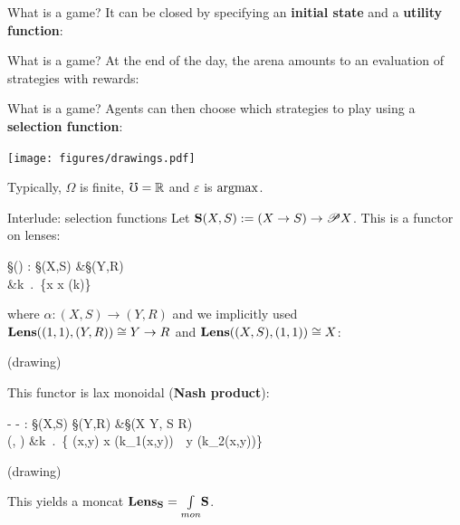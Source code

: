 \begin{frame}{What is a game?}
	It can be closed by specifying an \textbf{initial state} and a \textbf{utility function}:

	\begin{center}
	\end{center}
\end{frame}

\begin{frame}{What is a game?}
	At the end of the day, the \textcolor{colorarena}{arena} amounts to an evaluation of strategies with rewards:

	\vspace{5ex}
	\begin{center}
	\end{center}
\end{frame}

\begin{frame}{What is a game?}
	\textcolor{coloragents}{Agents} can then choose which strategies to play using a \textcolor{coloragents}{\textbf{selection function}}:


	\begin{center}
		\texttt{[image: figures/drawings.pdf]}
	\end{center}

	\textcolor{colornote}{Typically, $\Omega$ is finite, $\Comega = \R$ and $\varepsilon$ is $\operatorname{argmax}$.}
\end{frame}

\begin{frame}{Interlude: selection functions}
	Let $\mathbf{S}(X,S) := (X \to S) \to \mathscr{P}{X}$. This is a functor on lenses:
	\begin{eqalign*}
		\S(\alpha) : \S(X,S) &\longto \S(Y,R)\\
		\varepsilon &\longmapsto \lambda k \,.\, \{x \cmp \alpha \suchthat x \in \varepsilon(\alpha \cmp k)\}
	\end{eqalign*}
	where $\alpha : (X, S) \to (Y,R)$ and we implicitly used $\mathbf{Lens}((1,1),(Y,R)) \overset{}{\cong} Y \to R$ and $\mathbf{Lens}((X,S),(1,1)) \overset{}{\cong} X$:

	(drawing)

	This functor is lax monoidal (\textbf{Nash product}):
	\begin{eqalign*}
		- \boxtimes - : \S(X,S) \times \S(Y,R) &\longto \S(X \times Y, S \times R)\\
		(\varepsilon, \eta) &\longmapsto \lambda k \,.\, \{ (x,y) \suchthat x \in \varepsilon(k_1(x,y))\ \ y \in \eta(k_2(x,y))\}
	\end{eqalign*}
	(drawing)

	\textcolor{colornote}{This yields a moncat $\mathbf{Lens}_{\mathbf{S}} = \underset{mon}\int \mathbf{S}$.}
\end{frame}

